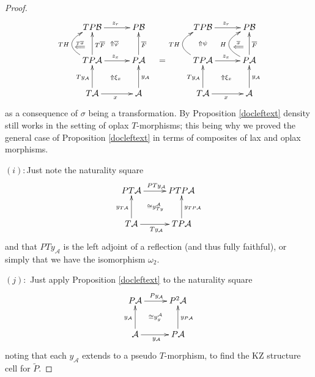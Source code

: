 \documentclass[a4paper,oneside,english]{amsart}
\numberwithin{equation}{section}
\numberwithin{figure}{section}
\theoremstyle{plain}
\theoremstyle{definition}
\theoremstyle{remark}
\theoremstyle{definition}
\theoremstyle{plain}
\theoremstyle{plain}
\theoremstyle{plain}
\begin{document}
\begin{proof}
\[
\xymatrix@=1em{ & TP\mathcal{B}\ar[rr]^{z_{r}}\ar@{}[ddrr]|-{\Uparrow\overline{\varphi}} &  & P\mathcal{B} &  &  & TP\mathcal{B}\ar[rr]^{z_{r}}\ar@{}[dd]|-{\Uparrow\psi} &  & P\mathcal{B}\\
\;\ar@{}[r]|-{\overset{T\overline{\sigma}}{\Longleftarrow}} & \; &  &  &  &  &  & \;\ar@{}[r]|-{\overset{\overline{\sigma}}{\Longleftarrow}} & \;\\
 & TP\mathcal{A}\ar[rr]^{z_{x}}\ar@{}[ddrr]|-{\Uparrow\xi_{x}}\ar[uu]_{T\overline{F}}\ar@/^{2pc}/[uu]^{TH} &  & P\mathcal{A}\ar[uu]_{\overline{F}} & = &  & TP\mathcal{A}\ar[rr]^{z_{x}}\ar@{}[ddrr]|-{\Uparrow\xi_{x}}\ar@/^{2pc}/[uu]^{TH} &  & P\mathcal{A}\ar[uu]_{\overline{F}}\ar@/^{2pc}/[uu]^{H}\\
 &  & \; &  &  &  &  & \;\\
 & T\mathcal{A}\ar[uu]^{Ty_{\mathcal{A}}}\ar[rr]_{x} &  & \mathcal{A}\ar[uu]_{y_{\mathcal{A}}} &  &  & T\mathcal{A}\ar[uu]^{Ty_{\mathcal{A}}}\ar[rr]_{x} &  & \mathcal{A}\ar[uu]_{y_{\mathcal{A}}}
}
\]
as a consequence of $\sigma$ being a transformation. By Proposition
\ref{docleftext} density still works in the setting of oplax $T$-morphisms;
this being why we proved the general case of Proposition \ref{docleftext}
in terms of composites of lax and oplax morphisms.

$\left(i\right)\colon$Just note the naturality square
\[
\xymatrix@=1em{PT\mathcal{A}\ar[rr]^{PTy_{\mathcal{A}}}\ar@{}[drdr]|-{\cong y_{Ty}^{\mathcal{A}}} &  & PTP\mathcal{A}\\
\\
T\mathcal{A}\ar[rr]_{Ty_{\mathcal{A}}}\ar[uu]^{y_{T\mathcal{A}}} &  & TP\mathcal{A}\ar[uu]_{y_{TP\mathcal{A}}}
}
\]
and that $PTy_{\mathcal{A}}$ is the left adjoint of a reflection
(and thus fully faithful), or simply that we have the isomorphism
$\omega_{2}$.

$\left(j\right)\colon$ Just apply Proposition \ref{docleftext} to
the naturality square 
\[
\xymatrix@=1em{P\mathcal{A}\ar[rr]^{Py_{\mathcal{A}}}\ar@{}[rrdd]|-{\cong y_{y}^{\mathcal{A}}} &  & P^{2}\mathcal{A}\\
\\
\mathcal{A}\ar[rr]_{y_{\mathcal{A}}}\ar[uu]^{y_{\mathcal{A}}} &  & P\mathcal{A}\ar[uu]_{y_{P\mathcal{A}}}
}
\]
noting that each $y_{\mathcal{A}}$ extends to a pseudo $T$-morphism,
to find the KZ structure cell for $\widetilde{P}$.\end{proof}
\end{document}
